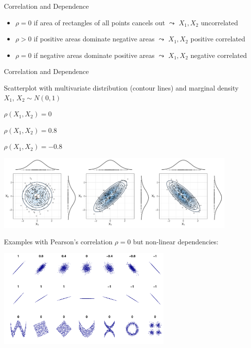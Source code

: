 \documentclass[11pt,compress,t,notes=noshow, aspectratio=169, xcolor=table]{beamer}
\begin{document}
\begin{frame}{Correlation and Dependence}
\medskip
\pause
\begin{itemize}
    \item $\rho = 0$ if area of rectangles of all points cancels out
    $\leadsto$ $X_1, X_2$ uncorrelated
    \item $\rho > 0$ if {\color{ggblue}positive areas} dominate {\color{ggred}negative areas} 
    $\leadsto$ $X_1, X_2$ positive correlated
    \item $\rho = 0$ if {\color{ggred}negative areas} dominate {\color{ggblue}positive areas} 
    $\leadsto$ $X_1, X_2$ negative correlated
\end{itemize}

\end{frame}



\begin{frame}{Correlation and Dependence}

Scatterplot with multivariate distribution (contour lines) and marginal density $X_1$, $X_2 \sim N(0,1)$ 

\begin{center}
\begin{minipage}[t]{0.3\textwidth}
\centering
 $\rho(X_1, X_2) = 0$
\end{minipage}
\begin{minipage}[t]{0.3\textwidth}
\centering
 $\rho(X_1, X_2) = 0.8$
\end{minipage}
\begin{minipage}[t]{0.3\textwidth}
\centering
 $\rho(X_1, X_2) = -0.8$
\end{minipage}
\includegraphics[width = 0.9\textwidth]{figure/dnorm_correlation.pdf}
\end{center}

\pause

Examples with Pearson's correlation $\rho = 0$ but non-linear dependencies:

\centering
\includegraphics[width = 0.65\textwidth, trim=0 0 0 190px, clip]{figure/dependence_2}
\end{frame}
\end{document}
